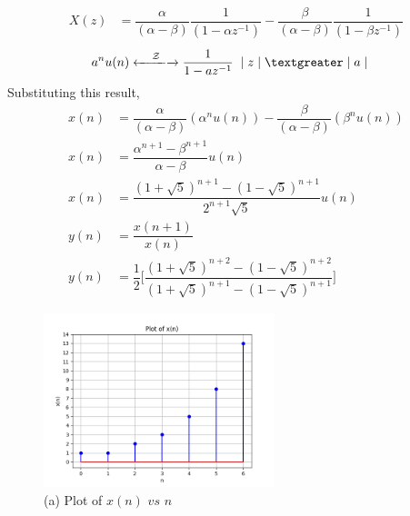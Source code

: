 \documentclass[journal,12pt,twocolumn]{IEEEtran}
\theoremstyle{remark}
\begin{document}
	\begin{align}
		X(z) &= \dfrac{\alpha}{(\alpha - \beta)} \dfrac{1}{(1 - \alpha z^{-1})} - \dfrac{\beta}{(\alpha - \beta)} \dfrac{1}{(1 - \beta z^{-1})}
	\end{align}
	\begin{align} &
	a^n u(n)
	\xleftarrow[]{\hspace{0.4cm}{\mathcal{Z}}\hspace{0.1cm}}\xrightarrow[]{}
	\dfrac{1}{1 - a z^{-1}} \hspace{0.2cm} \lvert \hspace{0.1cm} z \hspace{0.1cm}\rvert \hspace{0.1cm} \textgreater \hspace{0.1cm} \lvert \hspace{0.1cm} a \hspace{0.1cm} \rvert
	\end{align}
	Substituting this result,
	\begin{align}
		x(n) &= \dfrac{\alpha}{(\alpha - \beta)} (\alpha^n u(n)) - \dfrac{\beta}{(\alpha - \beta)} (\beta^n u(n))\\[3pt]
		x(n) &= \dfrac{\alpha^{n+1} - \beta^{n+1} }{\alpha - \beta} u(n)\\[10pt]
		x(n) &= \dfrac{(1 + \sqrt{5})^{n+1} - (1 - \sqrt{5})^{n+1} }{2^{n+1} \sqrt{5}} u(n)\\[10pt]
		y(n) &= \dfrac{x(n+1)}{x(n)}\\[10pt]
		y(n) &= \dfrac{1}{2} \Bigg[ \dfrac{(1 + \sqrt{5})^{n+2} - (1 - \sqrt{5})^{n+2}}{(1 + \sqrt{5})^{n+1} - (1 - \sqrt{5})^{n+1}} \Bigg]
	\end{align}
	
	\begin{figure}[htbp]
		\centering
		\includegraphics[width=0.6\textwidth]{ncert-maths/11/9/1/14/figures/fig1.png}
		\caption*{\hspace{2cm} (a) Plot of $x(n)$ $vs$ $n$}
	\end{figure}
	
\end{document}
